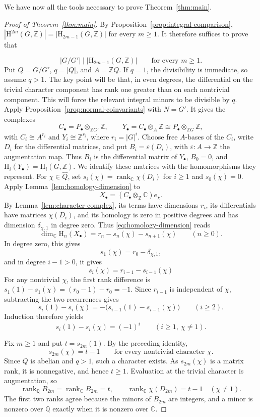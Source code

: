 \documentclass[11pt,a4paper]{amsart}
\numberwithin{equation}{section}
\DeclareMathOperator{\rank}{rank}
\newcommand{\HH}{\mathrm H}
\newcommand{\Z}{\mathbb Z}
\newcommand{\Q}{\mathbb Q}
\begin{document}
We have now all the tools necessary to prove Theorem~\ref{thm:main}.

\begin{proof}[Proof of Theorem~\ref{thm:main}]
By Proposition~\ref{prop:integral-comparison},
$|\HH^{2m}(G,\Z)|=|\HH_{2m-1}(G,\Z)|$ for every $m\geq1$.
It therefore suffices to prove that

$$|G/G'|\mid |\HH_{2m-1}(G,\mathbb Z)|
\qquad\text{for every }m\ge 1.
$$
Put $Q=G/G'$, $q=|Q|$, and $A=\Z Q$. If $q=1$, the
divisibility is immediate, so assume $q>1$.
The key point will be that, in even degrees, the differential
on the trivial character component has rank one greater than
on each nontrivial component. This will force the relevant
integral minors to be divisible by $q$.
Apply Proposition~\ref{prop:normal-coinvariants} with $N=G'$.
It gives the complexes
\[
 C_\bullet=P_\bullet\otimes_{\Z G'}\Z,
 \qquad
 Y_\bullet=C_\bullet\otimes_A\Z
 \cong P_\bullet\otimes_{\Z G}\Z,
\]
with $C_i\cong A^{r_i}$ and $Y_i\cong\Z^{r_i}$, where
$r_i=|G|^i$. Choose free $A$-bases of the $C_i$, write $D_i$
for the differential matrices, and put $B_i=\varepsilon(D_i)$, with $\varepsilon: A\rightarrow \Z$ the augmentation map.
Thus $B_i$ is the differential matrix of $Y_\bullet$,
$B_0=0$, and $\HH_i(Y_\bullet)=\HH_i(G,\Z)$.
We identify these matrices with the homomorphisms they represent.
For $\chi\in\widehat Q$, set
$s_i(\chi)=\rank_{\mathbb C}\chi(D_i)$ for $i\geq1$ and
$s_0(\chi)=0$. Apply Lemma~\ref{lem:homology-dimension} to
\[
 X_\bullet=(C_\bullet\otimes_\Z\mathbb C)e_\chi.
\]
By Lemma~\ref{lem:character-complex}, its terms have dimensions
$r_i$, its differentials have matrices $\chi(D_i)$, and its
homology is zero in positive degrees and has dimension
$\delta_{\chi,1}$ in degree zero. Thus
\eqref{eq:homology-dimension} reads
\[
 \dim_{\mathbb C}\HH_n(X_\bullet)
 =r_n-s_n(\chi)-s_{n+1}(\chi)\qquad(n\geq0).
\]
In degree zero, this gives
\[
 s_1(\chi)=r_0-\delta_{\chi,1},
\]
and in degree $i-1>0$, it gives
\[
 s_i(\chi)=r_{i-1}-s_{i-1}(\chi)
\]
For any nontrivial $\chi$, the first rank difference is
$s_1(1)-s_1(\chi)=(r_0-1)-r_0=-1$.
Since $r_{i-1}$ is independent of $\chi$, subtracting the
two recurrences gives
\[
 s_i(1)-s_i(\chi)
 =-\bigl(s_{i-1}(1)-s_{i-1}(\chi)\bigr)\qquad(i\geq2).
\]
Induction therefore yields
\[
 s_i(1)-s_i(\chi)=(-1)^i\qquad(i\geq1,\ \chi\neq1).
\]

Fix \(m\geq1\) and put \(t=s_{2m}(1)\). By the preceding identity,
\[
s_{2m}(\chi)=t-1
\qquad\text{for every nontrivial character }\chi.
\]
Since \(Q\) is abelian and \(q>1\), such a character exists. As \(s_{2m}(\chi)\) is a matrix rank, it is nonnegative, and hence \(t\geq1\).
Evaluation at the trivial character
is augmentation, so
\[
 \rank_{\Q}B_{2m}=\rank_{\mathbb C}B_{2m}=t,
 \qquad
 \rank_{\mathbb C}\chi(D_{2m})=t-1\quad(\chi\neq1).
\]
The first two ranks agree because the minors of $B_{2m}$ are
integers, and a minor is nonzero over $\Q$ exactly when it is
nonzero over $\mathbb C$.


\end{proof}
\end{document}
